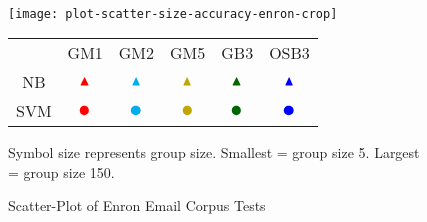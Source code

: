 		
\paragraph*{}
	\begin{sidewaysfigure}[htbp!]
		\begin{center}
		\centering
		\texttt{[image: plot-scatter-size-accuracy-enron-crop]}
			
		\begin{tabular}{cccccc}
			
			  	& GM1	& GM2	& GM5	& GB3	& OSB3	\\
			NB	& $ \color{red} \blacktriangle$ & $\color{cyan} \blacktriangle$ & $\color{MyDarkYellow} \blacktriangle$ & $\color{MyOliveGreen} \blacktriangle$ & $\color{blue} \blacktriangle$ \\ 					
			SVM	& $ \color{red} \CIRCLE$ & $\color{cyan} \CIRCLE$ & $\color{MyDarkYellow} \CIRCLE$ & $\color{MyOliveGreen} \CIRCLE$ & $\color{blue} \CIRCLE$ \\
		\end{tabular}
		\begin{singlespace}
		Symbol size represents group size.  Smallest = group size 5.  Largest = group size 150.  
		\end{singlespace}
		\caption{Scatter-Plot of Enron Email Corpus Tests}
		\label{fig:plot-scatter-enron}
		\end{center}
	\end{sidewaysfigure}
	
